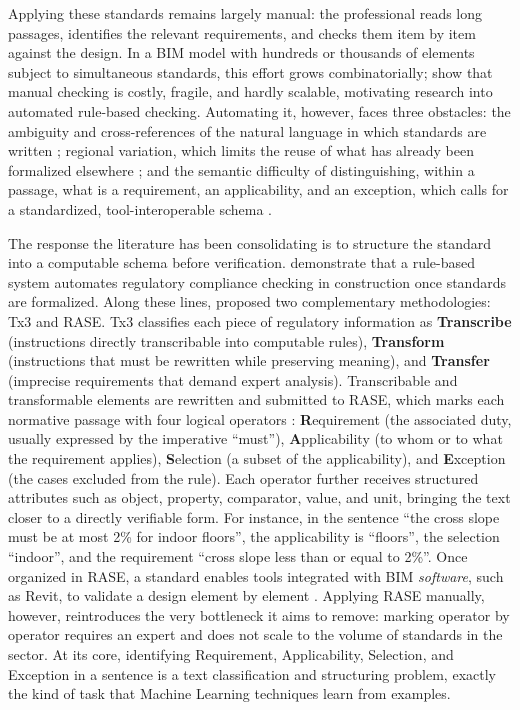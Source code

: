 \documentclass[a4paper,fleqn]{cas-sc}
\begin{document}
Applying these standards remains largely manual: the professional reads long passages, identifies the relevant requirements, and checks them item by item against the design. In a BIM model with hundreds or thousands of elements subject to simultaneous standards, this effort grows combinatorially; \citet{eastman2009} show that manual checking is costly, fragile, and hardly scalable, motivating research into automated rule-based checking. Automating it, however, faces three obstacles: the ambiguity and cross-references of the natural language in which standards are written \citep{dimyadi2013}; regional variation, which limits the reuse of what has already been formalized elsewhere \citep{dimyadi2013,solihin2015}; and the semantic difficulty of distinguishing, within a passage, what is a requirement, an applicability, and an exception, which calls for a standardized, tool-interoperable schema \citep{solihin2015}.

The response the literature has been consolidating is to structure the standard into a computable schema before verification. \citet{beach2015} demonstrate that a rule-based system automates regulatory compliance checking in construction once standards are formalized. Along these lines, \citet{hjelseth2015} proposed two complementary methodologies: Tx3 and RASE. Tx3 classifies each piece of regulatory information as \textbf{Transcribe} (instructions directly transcribable into computable rules), \textbf{Transform} (instructions that must be rewritten while preserving meaning), and \textbf{Transfer} (imprecise requirements that demand expert analysis). Transcribable and transformable elements are rewritten and submitted to RASE, which marks each normative passage with four logical operators \citep{hjelseth2011}: \textbf{R}equirement (the associated duty, usually expressed by the imperative ``must''), \textbf{A}pplicability (to whom or to what the requirement applies), \textbf{S}election (a subset of the applicability), and \textbf{E}xception (the cases excluded from the rule). Each operator further receives structured attributes such as object, property, comparator, value, and unit, bringing the text closer to a directly verifiable form. For instance, in the sentence ``the cross slope must be at most 2\% for indoor floors'', the applicability is ``floors'', the selection ``indoor'', and the requirement ``cross slope less than or equal to 2\%''. Once organized in RASE, a standard enables tools integrated with BIM \textit{software}, such as Revit, to validate a design element by element \citep{santos2021}. Applying RASE manually, however, reintroduces the very bottleneck it aims to remove: marking operator by operator requires an expert and does not scale to the volume of standards in the sector. At its core, identifying Requirement, Applicability, Selection, and Exception in a sentence is a text classification and structuring problem, exactly the kind of task that Machine Learning techniques learn from examples.
\end{document}
